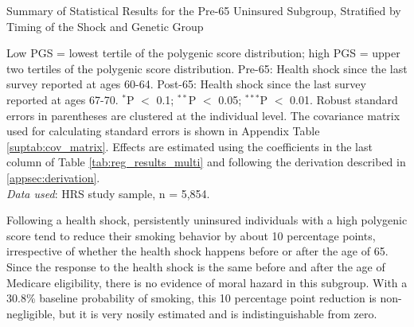 \documentclass[11pt]{article}
\begin{document}
\begin{table}[!ht]
	\caption{Summary of Statistical Results for the Pre-65 Uninsured Subgroup, Stratified by Timing of the Shock and Genetic Group}
	\label{tab:main_effects}
	
		\begin{flushleft}
			Low PGS = lowest tertile of the polygenic score distribution; high PGS = upper two tertiles of the polygenic score distribution.
			Pre-65: Health shock since the last survey reported at ages 60-64.
			Post-65: Health shock since the last survey reported at ages 67-70.
			$^{*}$P $<$ 0.1; $^{**}$P $<$ 0.05; $^{***}$P $<$ 0.01. Robust standard errors in parentheses are clustered at the individual level.
			The covariance matrix used for calculating standard errors is shown in Appendix Table \ref{suptab:cov_matrix}.
			Effects are estimated using the coefficients in the last column of Table \ref{tab:reg_results_multi} and following the derivation described in \ref{appsec:derivation}.\\
			\textit{Data used}: HRS study sample, n = 5,854.
		\end{flushleft}
\end{table}


Following a health shock, persistently uninsured individuals with a high polygenic score tend to reduce their smoking behavior by about 10 percentage points, irrespective of whether the health shock happens before or after the age of 65.
Since the response to the health shock is the same before and after the age of Medicare eligibility, there is no evidence of moral hazard in this subgroup.
With a 30.8\% baseline probability of smoking, this 10 percentage point reduction is non-negligible, but it is very nosily estimated and is indistinguishable from zero.
\end{document}
